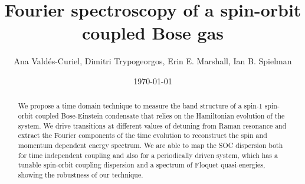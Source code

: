 \documentclass[12pt]{iopart}
\begin{document}
		
\title{Fourier spectroscopy of a spin-orbit coupled Bose gas}
	
\author{Ana Vald\'es-Curiel, Dimitri Trypogeorgos, Erin E. Marshall, Ian B. Spielman}
\address{Joint Quantum Institute, University of Maryland and National Institute of Standards and Technology, College Park, Maryland, 20742, USA}
\date{\today}

\begin{abstract}
	
	 We propose a time domain technique to measure the band structure of a spin-1 spin-orbit coupled Bose-Einstein condensate that relies on the Hamiltonian evolution of the system. We drive transitions at different values of detuning from Raman resonance and extract the Fourier components of the time evolution to reconstruct the spin and momentum dependent energy spectrum. We are able to map the SOC dispersion both for time independent coupling and also for a periodically driven system, which has a tunable spin-orbit coupling dispersion and a spectrum of Floquet quasi-energies, showing the robustness of our technique.
	 
\end{abstract}

\maketitle









%


\end{document}
